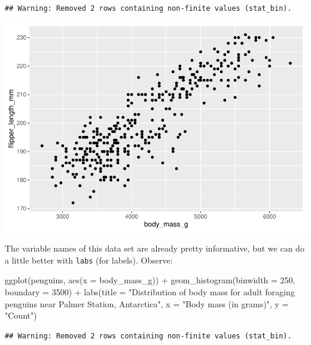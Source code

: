 \documentclass[
]{book}
\newenvironment{Shaded}{\begin{snugshade}}{\end{snugshade}}
\newcommand{\AttributeTok}[1]{\textcolor[rgb]{0.77,0.63,0.00}{#1}}
\newcommand{\DecValTok}[1]{\textcolor[rgb]{0.00,0.00,0.81}{#1}}
\newcommand{\FunctionTok}[1]{\textcolor[rgb]{0.00,0.00,0.00}{#1}}
\newcommand{\NormalTok}[1]{#1}
\newcommand{\SpecialCharTok}[1]{\textcolor[rgb]{0.00,0.00,0.00}{#1}}
\newcommand{\StringTok}[1]{\textcolor[rgb]{0.31,0.60,0.02}{#1}}
\begin{document}
\begin{verbatim}
## Warning: Removed 2 rows containing non-finite values (stat_bin).
\end{verbatim}

\includegraphics{intro_stats_files/figure-latex/unnamed-chunk-114-1.pdf}

The variable names of this data set are already pretty informative, but we can do a little better with \texttt{labs} (for labels). Observe:

\begin{Shaded}
\begin{Highlighting}[]
\FunctionTok{ggplot}\NormalTok{(penguins, }\FunctionTok{aes}\NormalTok{(}\AttributeTok{x =}\NormalTok{ body\_mass\_g)) }\SpecialCharTok{+}
    \FunctionTok{geom\_histogram}\NormalTok{(}\AttributeTok{binwidth =} \DecValTok{250}\NormalTok{, }\AttributeTok{boundary =} \DecValTok{3500}\NormalTok{) }\SpecialCharTok{+}
    \FunctionTok{labs}\NormalTok{(}\AttributeTok{title =} \StringTok{"Distribution of body mass for adult foraging penguins near}
\StringTok{         Palmer Station, Antarctica"}\NormalTok{,}
         \AttributeTok{x =} \StringTok{"Body mass (in grams)"}\NormalTok{,}
         \AttributeTok{y =} \StringTok{"Count"}\NormalTok{)}
\end{Highlighting}
\end{Shaded}

\begin{verbatim}
## Warning: Removed 2 rows containing non-finite values (stat_bin).
\end{verbatim}
\end{document}
